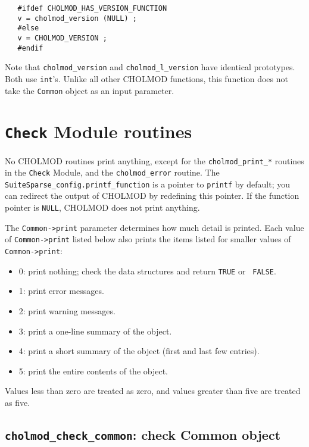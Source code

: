 \documentclass[11pt]{article}
\begin{document}
\begin{verbatim}
   #ifdef CHOLMOD_HAS_VERSION_FUNCTION
   v = cholmod_version (NULL) ;
   #else
   v = CHOLMOD_VERSION ;
   #endif
\end{verbatim}

Note that {\tt cholmod\_version} and {\tt cholmod\_l\_version} have identical
prototypes.  Both use {\tt int}'s.  Unlike all other CHOLMOD functions, this
function does not take the {\tt Common} object as an input parameter.

\newpage \section{{\tt Check} Module routines}

No CHOLMOD routines print anything, except for the {\tt cholmod\_print\_*}
routines in the {\tt Check} Module, and the {\tt cholmod\_error} routine.  The
{\tt SuiteSparse\_config.printf\_function} is a pointer to {\tt printf} by
default; you can redirect the output of CHOLMOD by redefining this pointer.  If
the function pointer is {\tt NULL}, CHOLMOD does not print anything.

The {\tt Common->print} parameter determines how much detail is printed.  Each
value of {\tt Common->print} listed below also prints the items listed for
smaller values of {\tt Common->print}:

\begin{itemize}
\item 0: print nothing; check the data structures and return {\tt TRUE} or {\tt
FALSE}.
\item 1: print error messages.
\item 2: print warning messages.
\item 3: print a one-line summary of the object.
\item 4: print a short summary of the object (first and last few entries).
\item 5: print the entire contents of the object.
\end{itemize}
Values less than zero are treated as zero, and values greater than five are
treated as five.

\subsection{{\tt cholmod\_check\_common}: check Common object}
\end{document}
